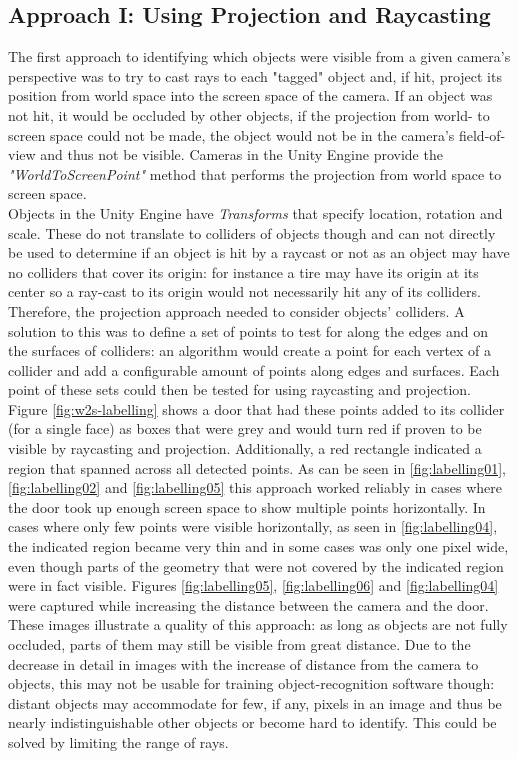 \subsection{Approach I: Using Projection and Raycasting}
The first approach to identifying which objects were visible from a given camera's perspective was to try to cast rays to each "tagged" object and, if hit, project its position from world space into the screen space of the camera. If an object was not hit, it would be occluded by other objects, if the projection from world- to screen space could not be made, the object would not be in the camera's field-of-view and thus not be visible. Cameras in the Unity Engine provide the \textit{"WorldToScreenPoint"} \cite{UnityDocsCamera} method that performs the projection from world space to screen space.\\
Objects in the Unity Engine have \textit{Transforms} that specify location, rotation and scale. These do not translate to colliders of objects though and can not directly be used to determine if an object is hit by a raycast or not as an object may have no colliders that cover its origin: for instance a tire may have its origin at its center so a ray-cast to its origin would not necessarily hit any of its colliders. Therefore, the projection approach needed to consider objects' colliders. A solution to this was to define a set of points to test for along the edges and on the surfaces of colliders: an algorithm would create a point for each vertex of a collider and add a configurable amount of points along edges and surfaces. Each point of these sets could then be tested for using raycasting and projection.\\
Figure \ref{fig:w2s-labelling} shows a door that had these points added to its collider (for a single face) as boxes that were grey and would turn red if proven to be visible by raycasting and projection. Additionally, a red rectangle indicated a region that spanned across all detected points. As can be seen in \ref{fig:labelling01}, \ref{fig:labelling02} and \ref{fig:labelling05} this approach worked reliably in cases where the door took up enough screen space to show multiple points horizontally. In cases where only few points were visible horizontally, as seen in \ref{fig:labelling04}, the indicated region became very thin and in some cases was only one pixel wide, even though parts of the geometry that were not covered by the indicated region were in fact visible. Figures \ref{fig:labelling05}, \ref{fig:labelling06} and \ref{fig:labelling04} were captured while increasing the distance between the camera and the door. These images illustrate a quality of this approach: as long as objects are not fully occluded, parts of them may still be visible from great distance. Due to the decrease in detail in images with the increase of distance from the camera to objects, this may not be usable for training object-recognition software though: distant objects may accommodate for few, if any, pixels in an image and thus be nearly indistinguishable other objects or become hard to identify. This could be solved by limiting the range of rays.\\
